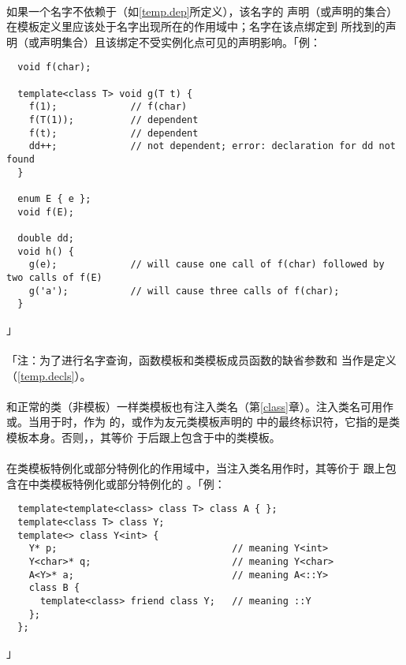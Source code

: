 \paragraph{}
如果一个名字不依赖于（如\ref{temp.dep}所定义），该名字的
声明（或声明的集合）在模板定义里应该处于名字出现所在的作用域中；名字在该点绑定到
所找到的声明（或声明集合）且该绑定不受实例化点可见的声明影响。「例：
\begin{lstlisting}
  void f(char);

  template<class T> void g(T t) {
    f(1);             // f(char)
    f(T(1));          // dependent
    f(t);             // dependent
    dd++;             // not dependent; error: declaration for dd not found
  }

  enum E { e };
  void f(E);

  double dd;
  void h() {
    g(e);             // will cause one call of f(char) followed by two calls of f(E)
    g('a');           // will cause three calls of f(char);
  }
\end{lstlisting}」

\paragraph{}
「注：为了进行名字查询，函数模板和类模板成员函数的缺省参数和
当作是定义（\ref{temp.decls}）。

\paragraph{}
和正常的类（非模板）一样类模板也有注入类名（第\ref{class}章）。注入类名可用作
或。当用于时，作为
的，或作为友元类模板声明的
中的最终标识符，它指的是类模板本身。否则，，其等价
于后跟上包含于\tm{<>}中的类模板。

\paragraph{}
在类模板特例化或部分特例化的作用域中，当注入类名用作时，其等价于
跟上包含在\tm{<>}中类模板特例化或部分特例化的
。「例：
\begin{lstlisting}
  template<template<class> class T> class A { };
  template<class T> class Y;
  template<> class Y<int> {
    Y* p;                               // meaning Y<int>
    Y<char>* q;                         // meaning Y<char>
    A<Y>* a;                            // meaning A<::Y>
    class B {
      template<class> friend class Y;   // meaning ::Y
    };
  };
\end{lstlisting}」

